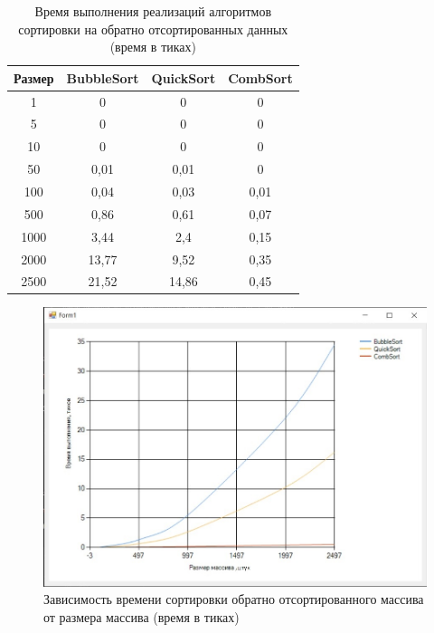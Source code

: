 \clearpage

\captionsetup{justification=raggedright, singlelinecheck=false}

\begin{table}[h]
	\begin{center}
		\caption{Время выполнения реализаций алгоритмов сортировки на обратно	отсортированных данных (время в тиках)}
		\label{tbl:wor}
		\begin{tabular}{|c|c|c|c|}
			\hline
			Размер & BubbleSort &  QuickSort &  CombSort \\
			\hline
			1&	0&	0&	0\\
			\hline
			5&	0&	0&	0\\
			\hline
			10&	0&	0&	0\\
			\hline
			50&	0,01&	0,01&	0\\
			\hline
			100&	0,04&	0,03&	0,01\\
			\hline
			500&	0,86&	0,61&	0,07\\
			\hline
			1000&	3,44&	2,4&	0,15\\
			\hline
			2000&	13,77&	9,52&	0,35\\
			\hline
			2500&	21,52&	14,86&	0,45\\
			\hline
		\end{tabular}
	\end{center}
	
\end{table}

\captionsetup{justification=centering, singlelinecheck=false}

\begin{figure}[H]
	\centering
	\includegraphics[width=0.7\linewidth]{inc/img/rev}
	\caption{Зависимость времени сортировки обратно отсортированного массива от размера массива (время в тиках)}
	\label{fig:rev}
\end{figure}

\clearpage

